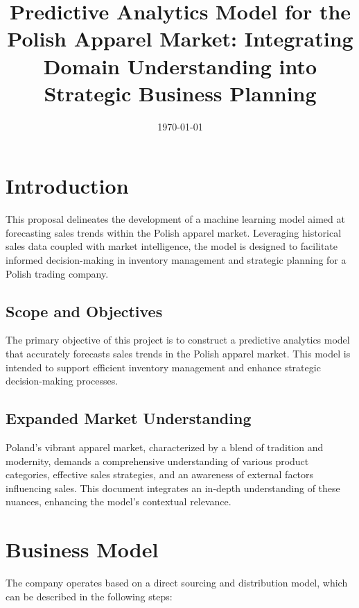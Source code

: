\documentclass{article}
\begin{document}
\title{Predictive Analytics Model for the Polish Apparel Market: Integrating Domain Understanding into Strategic Business Planning}
\date{\today}
\maketitle

\newpage
\tableofcontents
\newpage

\section{Introduction}
This proposal delineates the development of a machine learning model aimed at forecasting sales trends within the Polish apparel market. Leveraging historical sales data coupled with market intelligence, the model is designed to facilitate informed decision-making in inventory management and strategic planning for a Polish trading company.


\subsection{Scope and Objectives}
The primary objective of this project is to construct a predictive analytics model that accurately forecasts sales trends in the Polish apparel market. This model is intended to support efficient inventory management and enhance strategic decision-making processes.


\subsection{Expanded Market Understanding}
Poland's vibrant apparel market, characterized by a blend of tradition and modernity, demands a comprehensive understanding of various product categories, effective sales strategies, and an awareness of external factors influencing sales. This document integrates an in-depth understanding of these nuances, enhancing the model's contextual relevance.

\section{Business Model}
The company operates based on a direct sourcing and distribution model, which can be described in the following steps:
\end{document}
